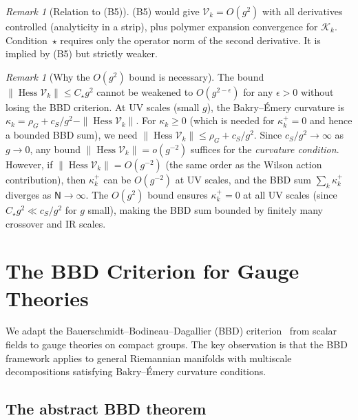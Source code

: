 \documentclass[11pt,a4paper]{article}
\theoremstyle{plain}
\theoremstyle{definition}
\theoremstyle{remark}
\newtheorem{remark}[theorem]{Remark}
\newcommand{\Hess}{\operatorname{Hess}}
\newcommand{\cV}{\mathcal{V}}
\newcommand{\cK}{\mathcal{K}}
\begin{document}
\begin{remark}[Relation to (B5)]
(B5) would give $\cV_k = O(g^2)$ with all derivatives
controlled (analyticity in a strip), plus polymer
expansion convergence for $\cK_k$. Condition~$\star$
requires only the operator norm of the second derivative.
It is implied by (B5) but strictly weaker.
\end{remark}

\begin{remark}[Why the $O(g^2)$ bound is necessary]
\label{rem:g2_necessary}
The bound $\|\Hess\cV_k\| \le C_\star g^2$ cannot be
weakened to $O(g^{2-\epsilon})$ for any $\epsilon > 0$
without losing the BBD criterion. At UV scales (small $g$),
the Bakry--\'Emery curvature is
$\kappa_k = \rho_G + c_S/g^2 - \|\Hess\cV_k\|$.
For $\kappa_k \ge 0$ (which is needed for $\kappa_k^+ = 0$
and hence a bounded BBD sum), we need
$\|\Hess\cV_k\| \le \rho_G + c_S/g^2$. Since
$c_S/g^2 \to \infty$ as $g \to 0$, any bound
$\|\Hess\cV_k\| = o(g^{-2})$ suffices for the
\emph{curvature condition}. However, if
$\|\Hess\cV_k\| = O(g^{-2})$ (the same order as
the Wilson action contribution), then $\kappa_k^+$
can be $O(g^{-2})$ at UV scales, and the BBD sum
$\sum_k \kappa_k^+$ diverges as $\mathsf{N} \to \infty$.
The $O(g^2)$ bound ensures $\kappa_k^+ = 0$ at all UV
scales (since $C_\star g^2 \ll c_S/g^2$ for $g$ small),
making the BBD sum bounded by finitely many crossover
and IR scales.
\end{remark}

\section{The BBD Criterion for Gauge Theories}
\label{sec:bbd}

We adapt the Bauerschmidt--Bodineau--Dagallier (BBD)
criterion~\cite{BBD24} from scalar fields to gauge
theories on compact groups. The key observation is that
the BBD framework applies to general Riemannian manifolds
with multiscale decompositions satisfying Bakry--\'Emery
curvature conditions.

\subsection{The abstract BBD theorem}
\end{document}
